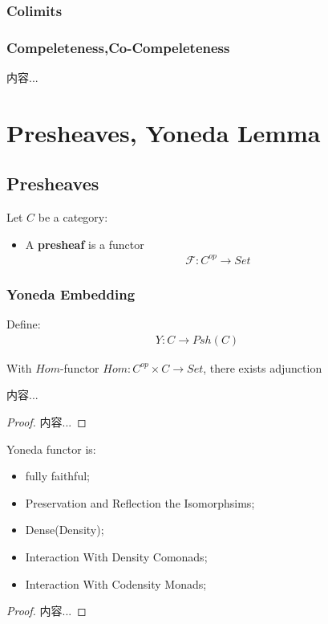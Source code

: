 \documentclass[Total.tex]{subfiles}
\begin{document}
			\subsection{Colimits}
			
			\subsection{Compeleteness,Co-Compeleteness}
			\begin{Def}
				内容...
			\end{Def}
	\chapter{Presheaves, Yoneda Lemma}
		\section{Presheaves}
			\begin{Def}
				Let $C$ be a category:
				\begin{itemize}
					\item A \textbf{presheaf} is a functor
					\begin{gather*}
						\mathscr{F}:C^{op}\rightarrow Set
					\end{gather*}
				\end{itemize}
			\end{Def}
			\subsection{Yoneda Embedding}
			\begin{Def}
				Define:
				\begin{gather*}
					Y:C\rightarrow Psh(C)\qquad
				\end{gather*}
			\end{Def}
			
			With $Hom$-functor $Hom:C^{op}\times C\rightarrow Set$, there exists adjunction
			\begin{lemma}
				内容...
			\end{lemma}
			\begin{proof}
				内容...
			\end{proof}
			
			\begin{proposition}
				Yoneda functor is:
				\begin{itemize}
					\item fully faithful;
					\item Preservation and Reflection the Isomorphsims;
					\item Dense(Density);
					\item Interaction With Density Comonads;
					\item Interaction With Codensity Monads;
				\end{itemize}
			\end{proposition}
			\begin{proof}
				内容...
			\end{proof}
			
\end{document}
